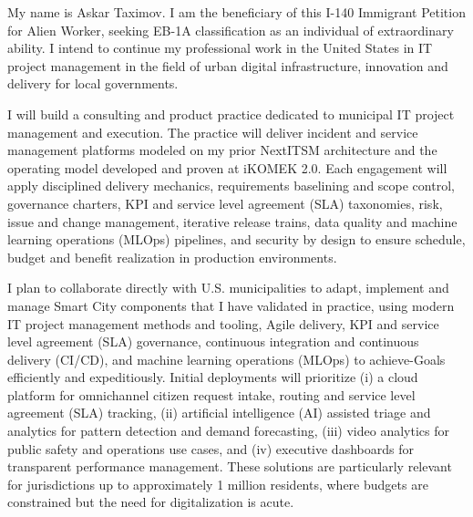 
\label{WorkPlan}

My name is Askar Taximov.
I am the beneficiary of this I-140 Immigrant Petition for Alien Worker, seeking EB-1A classification as an individual of extraordinary ability.
I intend to continue my professional work in the United States in IT project management in the field of urban digital infrastructure, innovation and delivery for local governments.

I will build a consulting and product practice dedicated to municipal IT project management and execution.
The practice will deliver incident and service management platforms modeled on my prior NextITSM architecture and the operating model developed and proven at iKOMEK 2.0.
Each engagement will apply disciplined delivery mechanics, requirements baselining and scope control, governance charters, KPI and service level agreement (SLA) taxonomies, risk, issue and change management, iterative release trains, data quality and machine learning operations (MLOps) pipelines, and security by design to ensure schedule, budget and benefit realization in production environments.

I plan to collaborate directly with U.S. municipalities to adapt, implement and manage Smart City components that I have validated in practice, using modern IT project management methods and tooling, Agile delivery, KPI and service level agreement (SLA) governance, continuous integration and continuous delivery (CI/CD), and machine learning operations (MLOps) to achieve-Goals efficiently and expeditiously. Initial deployments will prioritize (i) a cloud platform for omnichannel citizen request intake, routing and service level agreement (SLA) tracking, (ii) artificial intelligence (AI) assisted triage and analytics for pattern detection and demand forecasting, (iii) video analytics for public safety and operations use cases, and (iv) executive dashboards for transparent performance management. These solutions are particularly relevant for jurisdictions up to approximately 1 million residents, where budgets are constrained but the need for digitalization is acute.

